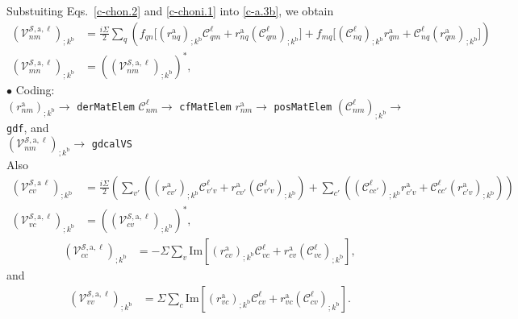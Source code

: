 Substuiting Eqs.~\eqref{c-chon.2} and \eqref{c-choni.1} into \eqref{c-a.3b}, we obtain
\begin{align}\label{c-a.3bnn}
\left(\mathcal{V}^{\mathcal{S},\mathrm{a},\ell}_{nm}\right)_{;k^\mathrm{b}}
&=
\frac{i\Sigma}{2}\sum_q\left(
f_{qn}\Big[
(r^\mathrm{a}_{nq})_{;k^\mathrm{b}}\mathcal{C}^\ell_{qm}
+    
r^\mathrm{a}_{nq}(\mathcal{C}^\ell_{qm})_{;k^\mathrm{b}}
\Big]
+
f_{mq}\Big[
(\mathcal{C}^\ell_{nq})_{;k^\mathrm{b}} r^\mathrm{a}_{qm}
+
\mathcal{C}^\ell_{nq} (r^\mathrm{a}_{qm})_{;k^\mathrm{b}}
\Big]
\right)
\nonumber\\
\left(\mathcal{V}^{\mathcal{S},\mathrm{a},\ell}_{mn}\right)_{;k^\mathrm{b}}
&=
\left(\left(\mathcal{V}^{\mathcal{S},\mathrm{a},\ell}_{nm}\right)_{;k^\mathrm{b}}\right)^*
,
\end{align}    
$\bullet$ Coding:\\
$(r^\mathrm{a}_{nm})_{;k^\mathrm{b}}\to$ \verb=derMatElem=
$\mathcal{C}^\ell_{nm}\to$ \verb=cfMatElem=
$r^\mathrm{a}_{nm}\to$ \verb=posMatElem=
$(\mathcal{C}^\ell_{nm})_{;k^\mathrm{b}}\to$ \verb=gdf=, and\\
$\left(\mathcal{V}^{\mathcal{S},\mathrm{a},\ell}_{nm}\right)_{;k^\mathrm{b}}\to$ 
\verb=gdcalVS=\\
Also
\begin{align}\label{dgvs.cv}
\left(\mathcal{V}^{\mathcal{S},\mathrm{a}\,\ell}_{cv}\right)_{;k^\mathrm{b}}
&=
\frac{i\Sigma}{2}
\left(
\sum_{v'}\left(
 (r^\mathrm{a}_{cv'})_{;k^\mathrm{b}}\mathcal{C}^\ell_{v'v}
+  
r^\mathrm{a}_{cv'}(\mathcal{C}^\ell_{v'v})_{;k^\mathrm{b}}
\right)
+
\sum_{c'}\left(
(\mathcal{C}^\ell_{cc'})_{;k^\mathrm{b}} r^\mathrm{a}_{c'v}
+
\mathcal{C}^\ell_{cc'} (r^\mathrm{a}_{c'v})_{;k^\mathrm{b}}
\right)
\right)
\nonumber\\
\left(\mathcal{V}^{\mathcal{S},\mathrm{a},\ell}_{vc}\right)_{;k^\mathrm{b}}
&=
\left(\left(\mathcal{V}^{\mathcal{S},\mathrm{a},\ell}_{cv}\right)_{;k^\mathrm{b}}\right)^*
,
\end{align}  
\begin{align}\label{dgvs.cc}
\left(\mathcal{V}^{\mathcal{S},\mathrm{a},\ell}_{cc}\right)_{;k^\mathrm{b}}
&=
-\Sigma
\sum_{v}
 \mathrm{Im}\left[(r^\mathrm{a}_{cv})_{;k^\mathrm{b}}\mathcal{C}^\ell_{vc}
+
r^\mathrm{a}_{cv}
(\mathcal{C}^\ell_{vc}) _{;k^\mathrm{b}}\right]
,
\end{align}  
and
\begin{align}\label{dgvs.vv}
\left(\mathcal{V}^{\mathcal{S},\mathrm{a},\ell}_{vv}\right)_{;k^\mathrm{b}}
&=
\Sigma
\sum_{c}
 \mathrm{Im}\left[(r^\mathrm{a}_{vc})_{;k^\mathrm{b}}\mathcal{C}^\ell_{cv}
+
r^\mathrm{a}_{vc}(\mathcal{C}^\ell_{cv}) _{;k^\mathrm{b}}\right]
.
\end{align}  

